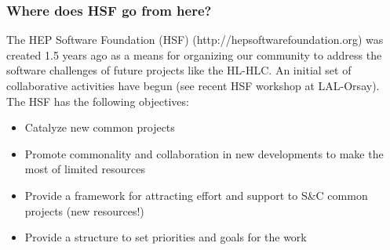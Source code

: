 \begin{frame}
 \frametitle{Where does HSF go from here?}
The HEP Software Foundation (HSF) (http://hepsoftwarefoundation.org) was created 1.5 years ago as a means for organizing our community to address the software challenges of future projects like the HL-HLC.
An initial set of collaborative activities have begun (see recent HSF workshop 
at LAL-Orsay). The HSF has the following objectives:

\begin{itemize}
\item Catalyze new common projects
\item Promote commonality and collaboration in new developments to make the most of limited resources
\item Provide a framework for attracting effort and support to S\&C common projects (new resources!)
\item Provide a structure to set priorities and goals for the work
\end{itemize}


\end{frame}


